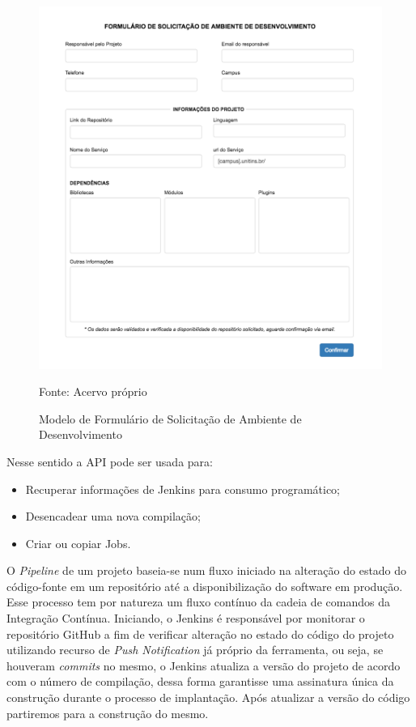 \par
\vspace{2cm}
\begin{figure}[htb]
	\centering
	\includegraphics[width=1\linewidth]{imagens/formulario}
	\caption{Modelo de Formulário de Solicitação de Ambiente de Desenvolvimento}
	Fonte: Acervo próprio
	\label{fig:formulario}
\end{figure}



Nesse sentido a API pode ser usada para:

\begin{itemize}
	\item Recuperar informações de Jenkins para consumo programático;
	\item Desencadear uma nova compilação;
	\item Criar ou copiar Jobs.
\end{itemize}


O \textit{Pipeline }de um projeto baseia-se num fluxo iniciado na alteração do estado do código-fonte em um repositório até a disponibilização do software em produção. Esse processo tem por natureza um fluxo contínuo da cadeia de comandos da Integração Contínua. Iniciando, o Jenkins é responsável por monitorar o repositório GitHub a fim de verificar alteração no estado do código do projeto utilizando recurso de \textit{Push Notification} já próprio da ferramenta, ou seja, se houveram \textit{commits} no mesmo, o Jenkins atualiza a versão do projeto de acordo com o número de compilação, dessa forma garantisse uma assinatura única da construção durante o processo de implantação. Após atualizar a versão do código partiremos para a construção do mesmo.

